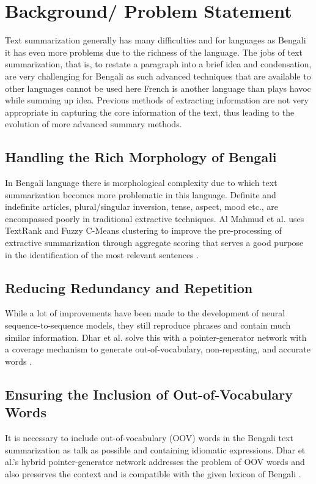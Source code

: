 \documentclass[12pt]{report}
\begin{document}
\section*{Background/ Problem Statement}
Text summarization generally has many difficulties and for languages as Bengali it has even more problems due to the richness of the language. The jobs of text summarization, that is, to restate a paragraph into a brief idea and condensation, are very challenging for Bengali as such advanced techniques that are available to other languages cannot be used here French is another language than plays havoc while summing up idea. Previous methods of extracting information are not very appropriate in capturing the core information of the text, thus leading to the evolution of more advanced summary methods.

\subsection*{Handling the Rich Morphology of Bengali}
In Bengali language there is morphological complexity due to which text summarization becomes more problematic in this language. Definite and indefinite articles, plural/singular inversion, tense, aspect, mood etc., are encompassed poorly in traditional extractive techniques. Al Mahmud et al. uses TextRank and Fuzzy C-Means clustering to improve the pre-processing of extractive summarization through aggregate scoring that serves a good purpose in the identification of the most relevant sentences \cite{rahman2019bengali}.

\subsection*{Reducing Redundancy and Repetition}
While a lot of improvements have been made to the development of neural sequence-to-sequence models, they still reproduce phrases and contain much similar information. Dhar et al. solve this with a pointer-generator network with a coverage mechanism to generate out-of-vocabulary, non-repeating, and accurate words \cite{dhar2021pointer}.

\subsection*{Ensuring the Inclusion of Out-of-Vocabulary Words}
It is necessary to include out-of-vocabulary (OOV) words in the Bengali text summarization as talk as possible and containing idiomatic expressions. Dhar et al.’s hybrid pointer-generator network addresses the problem of OOV words and also preserves the context and is compatible with the given lexicon of Bengali \cite{dhar2021pointer}.
\end{document}
